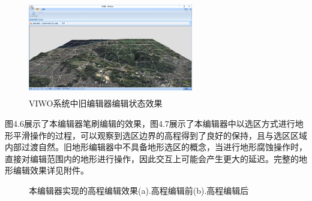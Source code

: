   \begin{figure}[h]
\centering
\includegraphics[height=4.2cm        ,width=7.2cm]{figures/old.png}
\caption{VIWO系统中旧编辑器编辑状态效果}
\end{figure}
图4.6展示了本编辑器笔刷编辑的效果，图4.7展示了本编辑器中以选区方式进行地形平滑操作的过程，可以观察到选区边界的高程得到了良好的保持，且与选区区域内部过渡自然。旧地形编辑器中不具备地形选区的概念，当进行地形腐蚀操作时，直接对编辑范围内的地形进行操作，因此交互上可能会产生更大的延迟。完整的地形编辑效果详见附件。\par
\begin{figure}[h]
\centering
{}
\caption{本编辑器实现的高程编辑效果(a).高程编辑前(b).高程编辑后}
\end{figure}

